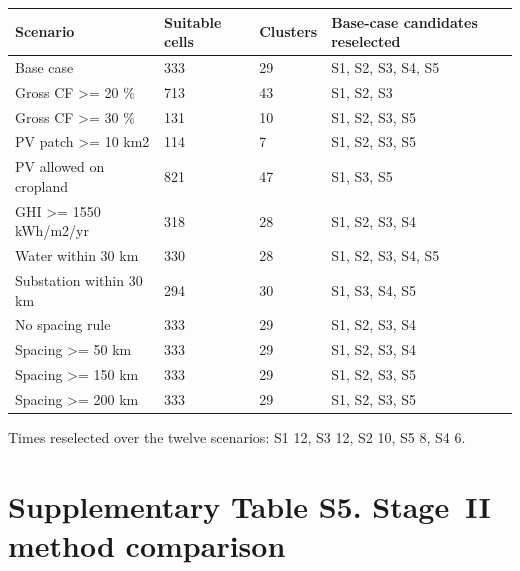 \documentclass[11pt,a4paper]{article}
\begin{document}
\begin{center}\footnotesize
\begin{tabularx}{\textwidth}{>{\hsize=0.852\hsize\raggedright\arraybackslash}Xll>{\hsize=1.148\hsize\raggedright\arraybackslash}X}
\toprule
\textbf{Scenario} & \textbf{Suitable cells} & \textbf{Clusters} & \textbf{Base-case candidates reselected} \\
\midrule
Base case & 333 & 29 & S1, S2, S3, S4, S5 \\
Gross CF >= 20 \% & 713 & 43 & S1, S2, S3 \\
Gross CF >= 30 \% & 131 & 10 & S1, S2, S3, S5 \\
PV patch >= 10 km2 & 114 & 7 & S1, S2, S3, S5 \\
PV allowed on cropland & 821 & 47 & S1, S3, S5 \\
GHI >= 1550 kWh/\allowbreak{}m2/\allowbreak{}yr & 318 & 28 & S1, S2, S3, S4 \\
Water within 30 km & 330 & 28 & S1, S2, S3, S4, S5 \\
Substation within 30 km & 294 & 30 & S1, S3, S4, S5 \\
No spacing rule & 333 & 29 & S1, S2, S3, S4 \\
Spacing >= 50 km & 333 & 29 & S1, S2, S3, S4 \\
Spacing >= 150 km & 333 & 29 & S1, S2, S3, S5 \\
Spacing >= 200 km & 333 & 29 & S1, S2, S3, S5 \\
\bottomrule
\end{tabularx}
\end{center}

Times reselected over the twelve scenarios: S1 12, S3 12, S2 10, S5 8, S4 6.

\newpage\section{Supplementary Table S5. Stage~II method comparison}
\end{document}
